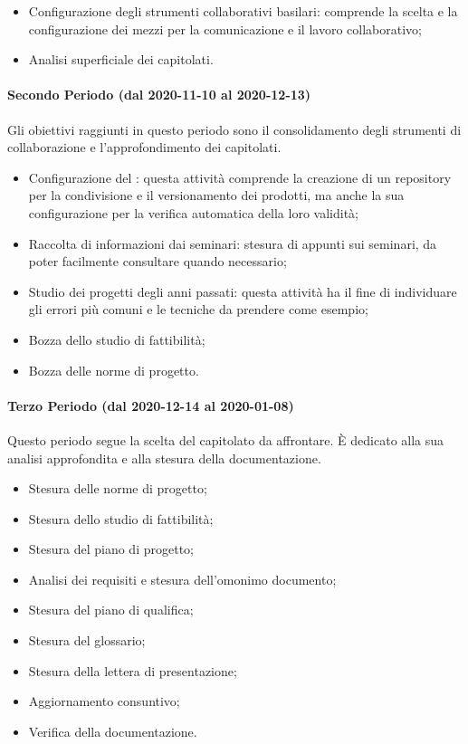 \begin{itemize}
	\item Configurazione degli strumenti collaborativi basilari: comprende la scelta e la configurazione dei mezzi per la comunicazione e il lavoro collaborativo;
	\item Analisi superficiale dei capitolati.
	
\end{itemize}

\paragraph{Secondo Periodo (dal 2020-11-10 al 2020-12-13)}
Gli obiettivi raggiunti in questo periodo sono il consolidamento degli strumenti di collaborazione e l'approfondimento dei capitolati.
\begin{itemize}
	\item Configurazione del : questa attività comprende la creazione di un repository per la condivisione e il versionamento dei prodotti, ma anche la sua configurazione per la verifica automatica della loro validità;
	\item Raccolta di informazioni dai seminari: stesura di appunti sui seminari, da poter facilmente consultare quando necessario;
	\item Studio dei progetti degli anni passati: questa attività ha il fine di individuare gli errori più comuni e le tecniche da prendere come esempio;
	\item Bozza dello studio di fattibilità;
	\item Bozza delle norme di progetto.
\end{itemize}

\paragraph{Terzo Periodo (dal 2020-12-14 al 2020-01-08)}
Questo periodo segue la scelta del capitolato da affrontare. È dedicato alla sua analisi approfondita e alla stesura della documentazione. 
\begin{itemize}
	\item Stesura delle norme di progetto;
	\item Stesura dello studio di fattibilità;
	\item Stesura del piano di progetto;
	\item Analisi dei requisiti e stesura dell'omonimo documento;
	\item Stesura del piano di qualifica;
	\item Stesura del glossario;
	\item Stesura della lettera di presentazione;
	\item Aggiornamento consuntivo;
	\item Verifica della documentazione.
\end{itemize}

